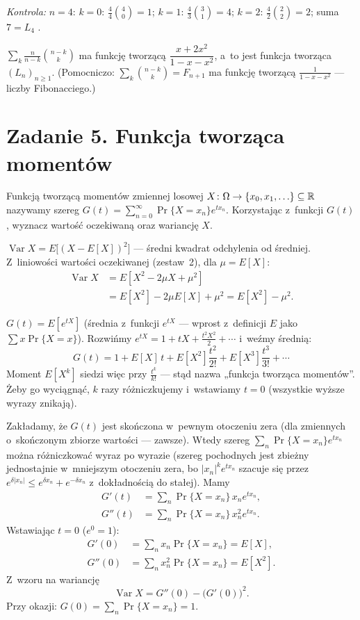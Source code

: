 \documentclass[11pt]{article}
\begin{document}
\emph{Kontrola:} $n=4$: $k=0$: $\frac44\binom40=1$; $k=1$: $\frac43\binom31=4$;
$k=2$: $\frac42\binom22=2$; suma $7=L_4$ \checkmark.
\begin{odpowiedz}
$\displaystyle\sum_{k}\frac n{n-k}\binom{n-k}k$ ma funkcję tworzącą
$\dfrac{x+2x^2}{1-x-x^2}$, a~to jest funkcja tworząca $(L_n)_{n\ge1}$.
(Pomocniczo: $\sum_k\binom{n-k}{k}=F_{n+1}$ ma funkcję tworzącą
$\frac1{1-x-x^2}$ --- liczby Fibonacciego.)
\end{odpowiedz}

\section{Zadanie 5. Funkcja tworząca momentów}
\begin{tresc}
Funkcją tworzącą momentów zmiennej losowej $X\colon\Omega\to\{x_0,x_1,\ldots\}
\subseteq\mathbb{R}$ nazywamy szereg $G(t)=\sum_{n=0}^\infty\Pr\{X=x_n\}e^{tx_n}$.
Korzystając z~funkcji $G(t)$, wyznacz wartość oczekiwaną oraz wariancję $X$.
\end{tresc}

\begin{teoria}[Wariancja]
$\operatorname{Var}X=E\bigl[(X-E[X])^2\bigr]$ --- średni kwadrat odchylenia
od średniej. Z~liniowości wartości oczekiwanej (zestaw~2),
dla $\mu=E[X]$:
\begin{align*}
\operatorname{Var}X&=E[X^2-2\mu X+\mu^2]\\
&=E[X^2]-2\mu E[X]+\mu^2=E[X^2]-\mu^2.
\end{align*}
\end{teoria}

\begin{intuicja}
$G(t)=E[e^{tX}]$ (średnia z~funkcji $e^{tX}$ --- wprost z~definicji $E$ jako
$\sum x\Pr\{X=x\}$). Rozwińmy $e^{tX}=1+tX+\frac{t^2X^2}{2}+\cdots$ i~weźmy
średnią:
\[
G(t)=1+E[X]\,t+E[X^2]\frac{t^2}{2!}+E[X^3]\frac{t^3}{3!}+\cdots
\]
Moment $E[X^k]$ siedzi więc przy $\frac{t^k}{k!}$ --- stąd nazwa „funkcja
tworząca momentów”. Żeby go wyciągnąć, $k$ razy różniczkujemy i~wstawiamy
$t=0$ (wszystkie wyższe wyrazy znikają).
\end{intuicja}

\formalnie
Zakładamy, że $G(t)$ jest skończona w~pewnym otoczeniu zera (dla zmiennych
o~skończonym zbiorze wartości --- zawsze). Wtedy szereg
$\sum_n\Pr\{X=x_n\}e^{tx_n}$ można różniczkować wyraz po wyrazie
(szereg pochodnych jest zbieżny jednostajnie w~mniejszym otoczeniu zera,
bo $|x_n|^ke^{t x_n}$ szacuje się przez $e^{\delta|x_n|}\le
e^{\delta x_n}+e^{-\delta x_n}$ z~dokładnością do stałej). Mamy
\begin{align*}
G'(t)&=\sum_n\Pr\{X=x_n\}\,x_ne^{tx_n},\\
G''(t)&=\sum_n\Pr\{X=x_n\}\,x_n^2e^{tx_n}.
\end{align*}
Wstawiając $t=0$ ($e^0=1$):
\begin{align*}
G'(0)&=\sum_n x_n\Pr\{X=x_n\}=E[X],\\
G''(0)&=\sum_n x_n^2\Pr\{X=x_n\}=E[X^2].
\end{align*}
Z~wzoru na wariancję
\[
\operatorname{Var}X=G''(0)-\bigl(G'(0)\bigr)^2.
\]
Przy okazji: $G(0)=\sum_n\Pr\{X=x_n\}=1$.
\end{document}
